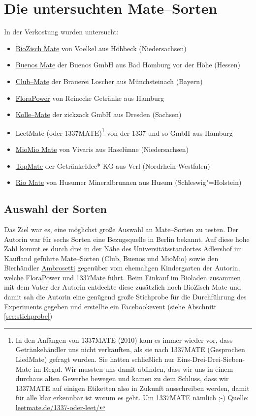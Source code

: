 \documentclass[11pt,a4paper,ngerman]{article}
\begin{document}
\section{Die untersuchten Mate--Sorten}
In der Verkostung wurden untersucht:
\begin{itemize}
 \item \href{http://www.voelkeljuice.de/sortiment/title/biozisch-mate/}{BioZisch Mate} von Voelkel aus Höhbeck (Niedersachsen)
 \item \href{http://www.buenos-icetea.com/buenos-mate/}{Buenos Mate} der Buenos GmbH aus Bad Homburg vor der Höhe (Hessen)
 \item \href{http://www.clubmate.de/}{Club--Mate} der Brauerei Loscher aus Münchsteinach (Bayern)
 \item \href{http://www.flora-power.de/}{FloraPower} von Reinecke Getränke aus Hamburg
 \item \href{http://kolle-mate.de/http://kolle-mate.de/}{Kolle--Mate} der zickzack GmbH aus Dresden (Sachsen)
 \item \href{http://leetmate.de/}{LeetMate} (oder 1337MATE)\footnote{In den Anfängen von 1337MATE (2010) kam es immer wieder vor, dass Getränkehändler uns nicht verkauften, als sie nach 1337MATE (Gesprochen LiedMate) gefragt wurden. Sie hatten schließlich nur Eins-Drei-Drei-Sieben-Mate im Regal.
Wir mussten uns damit abfinden, dass wir uns in einem durchaus alten Gewerbe bewegen und kamen zu dem Schluss, dass wir 1337MATE auf einigen Etiketten also in Zukunft ausschreiben werden, damit für alle klar erkennbar ist worum es geht. Um 1337MATE nämlich ;-) Quelle: \href{http://leetmate.de/1337-oder-leet/}{leetmate.de/1337-oder-leet/} }  von der 1337 und so GmbH aus Hamburg
 \item \href{http://www.vivaris.net/#c17}{MioMio Mate} von Vivaris aus Haselünne (Niedersachsen)
 \item \href{http://www.top-mate.de/}{TopMate} der GetränkeIdee* KG aus Verl (Nordrhein-Westfalen)
 \item \href{http://www.husumer-mineralbrunnen.de/produkte/rio-mate/}{Rio Mate} von Husumer Mineralbrunnen aus Husum  (Schleswig"=Holstein)
\end{itemize}

\subsection{Auswahl der Sorten}
Das Ziel war es, eine möglichst große Auswahl an Mate--Sorten zu testen. Der Autorin war für sechs Sorten eine Bezugsquelle in Berlin bekannt. Auf diese hohe Zahl kommt es durch drei in der Nähe des Universitätsstandortes Adlershof im Kaufland geführte Mate--Sorten (Club, Buenos und MioMio) sowie den Bierhändler \href{http://www.ambrosetti.de/}{Ambrosetti} gegenüber vom ehemaligen Kindergarten der Autorin, welche FloraPower und 1337Mate führt. Beim Einkauf im Bioladen zusammen mit dem Vater der Autorin entdeckte diese zusätzlich noch BioZisch Mate und damit sah die Autorin eine genügend große Stichprobe für die Durchführung des Experiments gegeben und erstellte ein Facebookevent (siehe Abschnitt \ref{sec:stichprobe})
\end{document}
